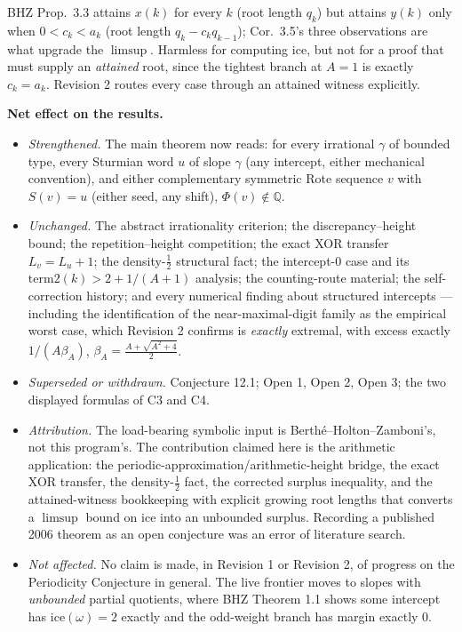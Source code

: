 \documentclass[11pt]{article}
\newcommand{\Q}{\mathbb{Q}}
\begin{document}
\begin{description}[leftmargin=2.2em,style=nextline,itemsep=3pt]
\item[C5. Conditional attainment of $y(k)$.] BHZ Prop.\ 3.3 attains $x(k)$ for every $k$ (root
length $q_k$) but attains $y(k)$ only when $0<c_k<a_k$ (root length $q_k-c_kq_{k-1}$); Cor.\ 3.5's
three observations are what upgrade the $\limsup$. Harmless for computing $\mathrm{ice}$, but not
for a proof that must supply an \emph{attained} root, since the tightest branch at $A=1$ is exactly
$c_k=a_k$. Revision 2 routes every case through an attained witness explicitly.

\end{description}

\medskip
\noindent\textbf{Net effect on the results.}
\begin{itemize}[leftmargin=1.4em,itemsep=2pt]
\item \emph{Strengthened.} The main theorem now reads: for every irrational $\gamma$ of bounded type,
every Sturmian word $u$ of slope $\gamma$ (any intercept, either mechanical convention), and either
complementary symmetric Rote sequence $v$ with $S(v)=u$ (either seed, any shift), $\Phi(v)\notin\Q$.
\item \emph{Unchanged.} The abstract irrationality criterion; the discrepancy--height bound; the
repetition--height competition; the exact XOR transfer $L_v=L_u+1$; the density-$\tfrac12$ structural
fact; the intercept-$0$ case and its $\mathrm{term2}(k)>2+1/(A+1)$ analysis; the counting-route
material; the self-correction history; and every numerical finding about structured intercepts ---
including the identification of the near-maximal-digit family as the empirical worst case, which
Revision 2 confirms is \emph{exactly} extremal, with excess exactly $1/(A\beta_A)$,
$\beta_A=\frac{A+\sqrt{A^2+4}}2$.
\item \emph{Superseded or withdrawn.} Conjecture 12.1; Open 1, Open 2, Open 3; the two displayed
formulas of C3 and C4.
\item \emph{Attribution.} The load-bearing symbolic input is Berth\'e--Holton--Zamboni's, not this
program's. The contribution claimed here is the arithmetic application: the
periodic-approximation/arithmetic-height bridge, the exact XOR transfer, the density-$\tfrac12$ fact,
the corrected surplus inequality, and the attained-witness bookkeeping with explicit growing root
lengths that converts a $\limsup$ bound on $\mathrm{ice}$ into an unbounded surplus. Recording a
published 2006 theorem as an open conjecture was an error of literature search.
\item \emph{Not affected.} No claim is made, in Revision 1 or Revision 2, of progress on the
Periodicity Conjecture in general. The live frontier moves to slopes with \emph{unbounded} partial
quotients, where BHZ Theorem 1.1 shows some intercept has $\mathrm{ice}(\omega)=2$ exactly and the
odd-weight branch has margin exactly $0$.
\end{itemize}
\end{document}
